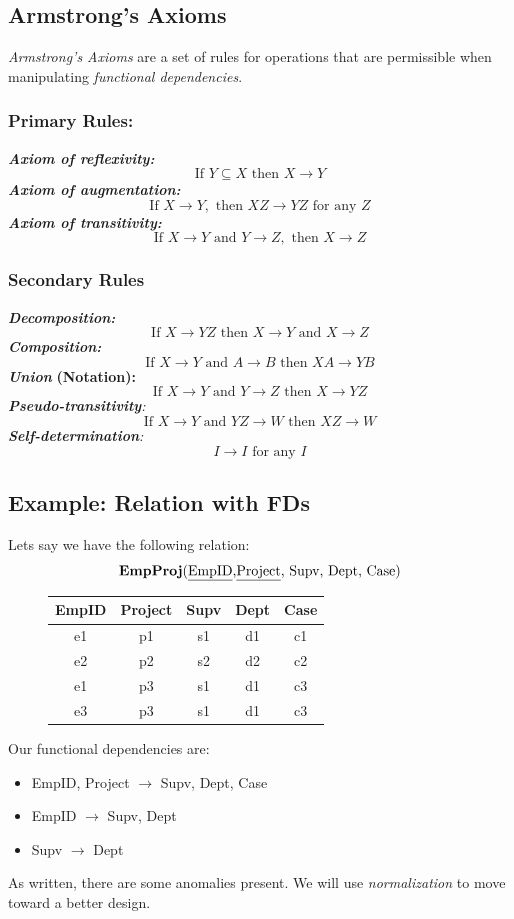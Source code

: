 \documentclass{report}
\begin{document}
\subsection{Armstrong's Axioms}
\textit{Armstrong's Axioms} are a set of rules for operations that are permissible when manipulating \textit{functional dependencies}.
\subsubsection*{Primary Rules:}
\textit{\textbf{Axiom of reflexivity:}}
$$ \text{If } Y \subseteq X \text{ then } X \rightarrow Y$$
\textit{\textbf{Axiom of augmentation:}}
$$ \text{If } X\rightarrow Y, \text{ then } XZ \rightarrow YZ \text{ for any } Z $$
\textit{\textbf{Axiom of transitivity:}}
$$ \text{If } X \rightarrow Y \text{ and } Y \rightarrow Z, \text{ then } X \rightarrow Z$$
\subsubsection*{Secondary Rules}
\textit{\textbf{Decomposition:}}
$$ \text{If } X \rightarrow YZ \text{ then } X \rightarrow Y \text{ and } X \rightarrow Z $$
\textit{\textbf{Composition:}}
$$ \text{If } X \rightarrow Y \text{ and } A \rightarrow B \text{ then } XA \rightarrow YB$$
\textit{\textbf{Union}}\textbf{ (Notation):}
$$ \text{If } X \rightarrow Y \text{ and } Y \rightarrow Z \text{ then } X \rightarrow YZ $$
\textit{\textbf{Pseudo-transitivity}:}
$$ \text{If } X \rightarrow Y \text{ and } YZ \rightarrow W \text{ then } XZ \rightarrow W $$
\textit{\textbf{Self-determination}:}
$$ I \rightarrow I \text{ for any } I $$
\subsection*{Example: Relation with FDs}
Lets say we have the following relation:
$$ \text{\textbf{EmpProj}(\underline{EmpID},\underline{Project}, Supv, Dept, Case)} $$
    \begin{figure}[H]
    \centering
    \setlength{\tabcolsep}{30}
    \begin{tabular}{c c c c c}
    \hline 
    EmpID & Project & Supv & Dept & Case \\
\hline
    e1 & p1 & s1 & d1 & c1 \\
    e2 & p2 & s2 & d2 & c2 \\
    e1 & p3 & s1 & d1 & c3 \\
    e3 & p3 & s1 & d1 & c3 \\
    \hline
    \end{tabular}
    \end{figure}
    \bigbreak \noindent
Our functional dependencies are:
\begin{itemize}
    \item EmpID, Project $\rightarrow$ Supv, Dept, Case
    \item  EmpID $\rightarrow$ Supv, Dept
    \item Supv $\rightarrow$ Dept
\end{itemize}
As written, there are some anomalies present. We will use \textit{normalization} to move toward a better design.
\end{document}
